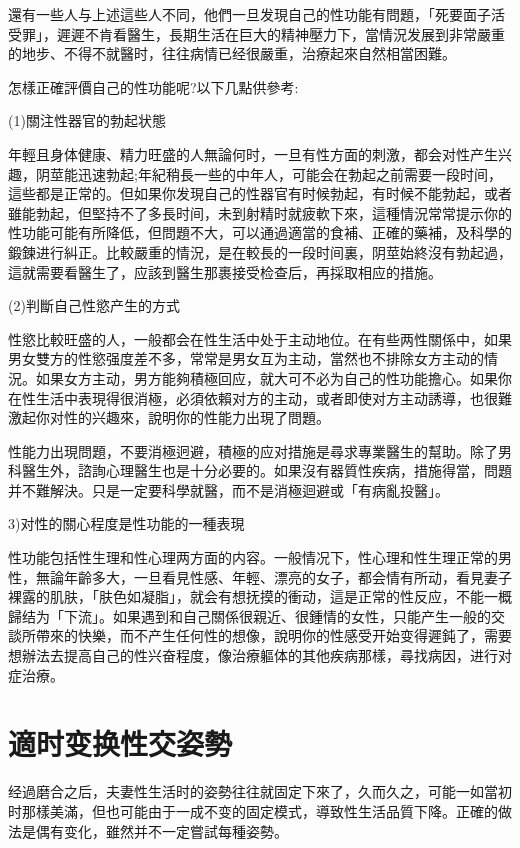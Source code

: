 \documentclass[12pt,UTF8]{ctexbook}
\begin{document}
還有一些人与上述這些人不同，他們一旦发現自己的性功能有問題，「死要面子活受罪」，遲遲不肯看醫生，長期生活在巨大的精神壓力下，當情況发展到非常嚴重的地步、不得不就醫时，往往病情已经很嚴重，治療起來自然相當困難。

怎樣正確評價自己的性功能呢?以下几點供參考:

(1)關注性器官的勃起状態

年輕且身体健康、精力旺盛的人無論何时，一旦有性方面的刺激，都会对性产生兴趣，阴莖能迅速勃起;年紀稍長一些的中年人，可能会在勃起之前需要一段时间，這些都是正常的。但如果你发現自己的性器官有时候勃起，有时候不能勃起，或者雖能勃起，但堅持不了多長时间，未到射精时就疲軟下來，這種情況常常提示你的性功能可能有所降低，但問題不大，可以通過適當的食補、正確的藥補，及科學的鍛鍊进行糾正。比較嚴重的情況，是在較長的一段时间裏，阴莖始終沒有勃起過，這就需要看醫生了，应該到醫生那裹接受检查后，再採取相应的措施。

(2)判斷自己性慾产生的方式

性慾比較旺盛的人，一般都会在性生活中处于主动地位。在有些两性關係中，如果男女雙方的性慾强度差不多，常常是男女互为主动，當然也不排除女方主动的情況。如果女方主动，男方能夠積極回应，就大可不必为自己的性功能擔心。如果你在性生活中表現得很消極，必須依賴对方的主动，或者即使对方主动誘導，也很難激起你对性的兴趣來，說明你的性能力出現了問題。

性能力出現問題，不要消極迥避，積極的应对措施是尋求專業醫生的幫助。除了男科醫生外，諮詢心理醫生也是十分必要的。如果沒有器質性疾病，措施得當，問題并不難解決。只是一定要科學就醫，而不是消極迴避或「有病亂投醫」。

3)对性的關心程度是性功能的一種表現

性功能包括性生理和性心理两方面的内容。一般情况下，性心理和性生理正常的男性，無論年齡多大，一旦看見性感、年輕、漂亮的女子，都会情有所动，看見妻子裸露的肌肤，「肤色如凝脂」，就会有想抚摸的衝动，這是正常的性反应，不能一概歸结为「下流」。如果遇到和自己關係很親近、很鍾情的女性，只能产生一般的交談所帶來的快樂，而不产生任何性的想像，說明你的性感受开始变得遲鈍了，需要想辦法去提高自己的性兴奋程度，像治療軀体的其他疾病那樣，尋找病因，进行对症治療。

\section{適时变换性交姿勢}

经過磨合之后，夫妻性生活时的姿勢往往就固定下來了，久而久之，可能一如當初时那樣美滿，但也可能由于一成不变的固定模式，導致性生活品質下降。正確的做法是偶有变化，雖然并不一定嘗試每種姿勢。
\end{document}

